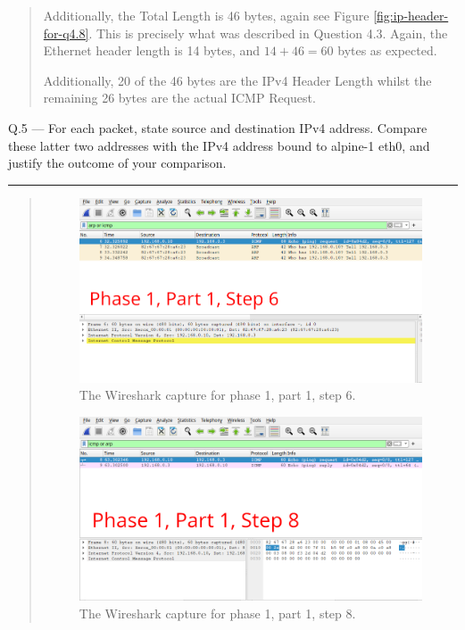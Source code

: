 \documentclass{article}
\newcommand\Que[2]{%
\begin{samepage}
\leavevmode\par
\noindent
Q.#1 --- #2\par\vspace{10pt}\hrule\vspace{10pt}
\end{samepage}}
\newenvironment{ans}
{\fbox{Answer}\begin{quote}\nopagebreak}
{\end{quote}}
\begin{document}
\begin{ans}
Additionally, the Total Length is 46 bytes, again see
Figure \ref{fig:ip-header-for-q4.8}. This is precisely what
was described in Question 4.3. Again, the Ethernet header
length is 14 bytes, and $14 + 46 = 60$ bytes as expected.

Additionally, 20 of the 46 bytes are the IPv4 Header Length
whilst the remaining 26 bytes are the actual ICMP Request.
\end{ans}

\newpage

\Que{5}{For each packet, state source and destination IPv4
address. Compare these latter two addresses with the IPv4
address bound to alpine-1 eth0, and justify the outcome of your
comparison.}

\begin{ans}
\begin{figure}[H]
\centering
\includegraphics[width=14cm]{data/q5-capture1.png}
\caption{The Wireshark capture for phase 1, part 1, step 6.}
\label{fig:wireshark-capture1-q5}
\end{figure}

\begin{figure}[H]
\centering
\includegraphics[width=14cm]{data/q5-capture2.png}
\caption{The Wireshark capture for phase 1, part 1, step 8.}
\label{fig:wireshark-capture2-q5}
\end{figure}


\end{ans}
\end{document}

